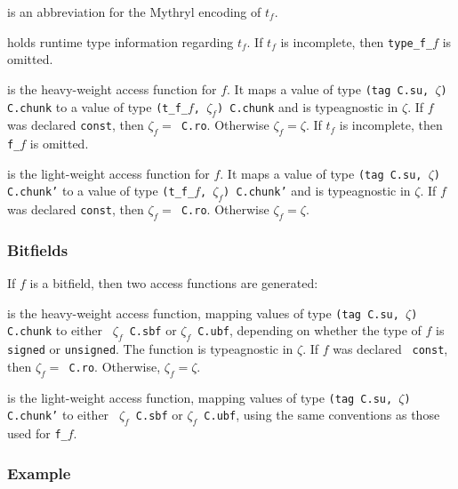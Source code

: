 \begin{description}\setlength{\itemsep}{0pt}
\item[{\tt type t\_f\_$f$}] is an abbreviation for the Mythryl encoding of $t_f$.
\item[!{\tt my type\_f\_$f$}] holds runtime type information regarding
  $t_f$.  If $t_f$ is incomplete, then {\tt type\_f\_$f$} is omitted.
\item[!{\tt my f\_$f$}] is the heavy-weight access function for $f$.
  It maps a value of type {\tt (tag C.su, $\zeta$) C.chunk} to a value
  of type {\tt (t\_f\_$f$, ${\zeta}_f$) C.chunk} and is typeagnostic in
  $\zeta$.  If $f$ was declared {\tt const}, then {\tt ${\zeta}_f =$
    C.ro}.  Otherwise ${\zeta}_f = \zeta$.  If $t_f$ is incomplete,
  then {\tt f\_$f$} is omitted.
\item[{\tt my f\_$f$'}] is the light-weight access function for $f$.
  It maps a value of type {\tt (tag C.su, $\zeta$) C.chunk'} to a value
  of type {\tt (t\_f\_$f$, ${\zeta}_f$) C.chunk'} and is typeagnostic in
  $\zeta$.  If $f$ was declared {\tt const}, then {\tt ${\zeta}_f =$
    C.ro}.  Otherwise ${\zeta}_f = \zeta$.
\end{description}

\subsubsection*{Bitfields}

If $f$ is a bitfield, then two access functions are generated:

\begin{description}\setlength{\itemsep}{0pt}
\item[{\tt my f\_$f$}] is the heavy-weight access function, mapping
  values of type {\tt (tag C.su, $\zeta$) C.chunk} to either {\tt
    ${\zeta}_f$ C.sbf} or {\tt ${\zeta}_f$ C.ubf}, depending on
  whether the type of $f$ is {\tt signed} or {\tt unsigned}.  The
  function is typeagnostic in $\zeta$.  If $f$ was declared {\tt
    const}, then {\tt ${\zeta}_f =$ C.ro}.  Otherwise, ${\zeta}_f =
  \zeta$.
\item[{\tt my f\_$f$'}] is the light-weight access function, mapping
  values of type {\tt (tag C.su, $\zeta$) C.chunk'} to either {\tt
    ${\zeta}_f$ C.sbf} or {\tt ${\zeta}_f$ C.ubf}, using the same
  conventions as those used for {\tt f\_$f$}.
\end{description}

\subsubsection*{Example}

